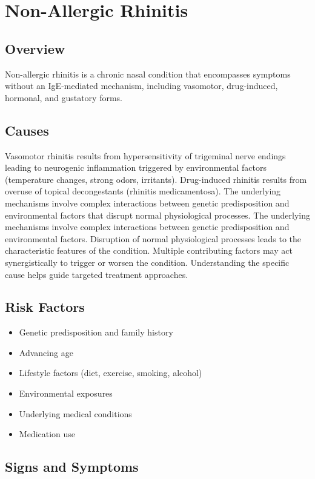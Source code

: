 \chapter{Non-Allergic Rhinitis}
\label{sec:Non-Allergic Rhinitis}

\section{Overview}
Non-allergic rhinitis is a chronic nasal condition that encompasses symptoms without an IgE-mediated mechanism, including vasomotor, drug-induced, hormonal, and gustatory forms.
\section{Causes}
Vasomotor rhinitis results from hypersensitivity of trigeminal nerve endings leading to neurogenic inflammation triggered by environmental factors (temperature changes, strong odors, irritants). Drug-induced rhinitis results from overuse of topical decongestants (rhinitis medicamentosa). The underlying mechanisms involve complex interactions between genetic predisposition and environmental factors that disrupt normal physiological processes. The underlying mechanisms involve complex interactions between genetic predisposition and environmental factors. Disruption of normal physiological processes leads to the characteristic features of the condition. Multiple contributing factors may act synergistically to trigger or worsen the condition. Understanding the specific cause helps guide targeted treatment approaches.
\section{Risk Factors}


\begin{itemize}[noitemsep]
  \item Genetic predisposition and family history
  \item Advancing age
  \item Lifestyle factors (diet, exercise, smoking, alcohol)
  \item Environmental exposures
  \item Underlying medical conditions
  \item Medication use
\end{itemize}
\section{Signs and Symptoms}


